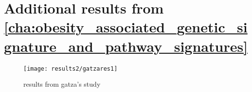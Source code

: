 	\chapter{Additional results from \cref{cha:obesity_associated_genetic_signature_and_pathway_signatures}}
	\label{app:b}

	\begin{figure}[htpb]
		\centering
		\texttt{[image: results2/gatzares1]}
		\caption{results from gatza's study}
		\label{fig:gatza_paper_res}
	\end{figure}




